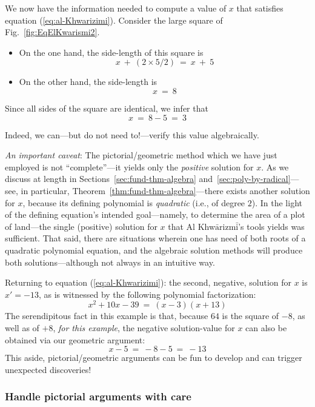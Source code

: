 \smallskip

We now have the information needed to compute a value of $x$ that satisfies equation (\ref{eq:al-Khwarizimi}).  Consider the large square of Fig.~\ref{fig:EqElKwarismi2}.

\begin{itemize}
\item
On the one hand, the side-length of this square is
\[ x \ + \ (2 \times 5/2) \ = \ x \ + \ 5 \]

\medskip\item
On the other hand, the side-length is
\[ x \ = \ 8 \]
\end{itemize}
Since all sides of the square are identical, we infer that
\[ x \ = \ 8-5 \ = \ 3 \]

\noindent
Indeed, we can---but do not need to!---verify this value algebraically.

\medskip

\noindent
{\em An important caveat}: The pictorial/geometric method which we have just employed is not ``complete''---it yields only the {\em positive} solution for $x$.  As we discuss at length in Sections~\ref{sec:fund-thm-algebra} and~\ref{sec:poly-by-radical}---see, in particular, Theorem~\ref{thm:fund-thm-algebra}---there exists another solution for $x$, because its defining polynomial is {\em quadratic} (i.e., of degree $2$).  In the light of the defining equation's intended goal---namely, to determine the area of a plot of land---the single (positive) solution for $x$ that Al Khw$\bar{\mbox{a}}$rizm$\bar{\mbox{i}}$'s tools yields was sufficient.  That said, there are situations wherein one has need of both roots of a quadratic polynomial equation, and the algebraic solution methods will produce both solutions---although not always in an intuitive way.

\medskip

Returning to equation (\ref{eq:al-Khwarizimi}):  the second, negative, solution for $x$  is $x' = -13$, as is witnessed by the following polynomial factorization:
\[ x^2 + 10x - 39 \ = \ (x-3)(x+13) \]
The serendipitous fact in this example is that, because $64$ is the square of $-8$, as well as of $+8$, {\em for this example}, the negative solution-value for $x$ can also be obtained via our geometric argument:
\[ x - 5 \ = \ -8 -5 \ = \ -13 \]
This aside, pictorial/geometric arguments can be fun to develop and can trigger unexpected discoveries!


\subsubsection{Handle pictorial arguments with care}

